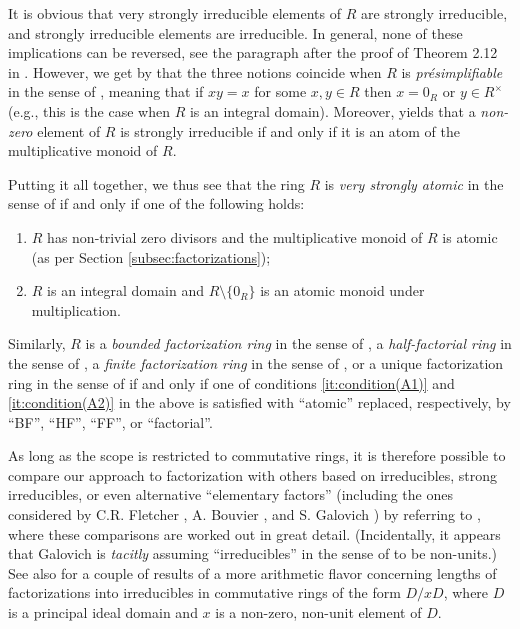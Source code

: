 It is obvious that very strongly irreducible elements of $R$ are strongly irreducible, and strongly irreducible elements are irreducible. In general, none of these implications can be reversed, see the paragraph after the proof of Theorem 2.12 in \cite{AnVL96}. However, we get by \cite[Theorem 2.2(3)]{AnVL96} that the three notions coincide when $R$ is \emph{pr\'esimplifiable} in the sense of \cite{Bou74a}, meaning that if $xy = x$ for some $x, y \in R$ then $x = 0_R$ or $y \in R^\times$ (e.g., this is the case when $R$ is an integral domain). Moreover, \cite[Theorem 2.5]{AnVL96} yields that a \emph{non-zero} element of $R$ is strongly irreducible if and only if it is an atom of the multiplicative monoid of $R$.

Putting it all together, we thus see that the ring $R$ is \emph{very strongly atomic} in the sense of \cite[Definition 3.1]{AnVL96} if and only if one of the following holds:
\begin{enumerate}[label={(\small{A}\arabic{*})}]
	\item\label{it:condition(A1)} $R$ has non-trivial zero divisors and the multiplicative monoid of $R$ is atomic (as per Section \ref{subsec:factorizations});
	\item\label{it:condition(A2)} $R$ is an integral domain and $R \setminus \{0_R\}$ is an atomic monoid under multiplication.
\end{enumerate}
Similarly, $R$ is a \emph{bounded factorization ring} in the sense of \cite[Definition 3.8]{AnVL96}, a \emph{half-factorial ring} in the sense of \cite[p. 87]{axtell-et-al03}, a \emph{finite factorization ring} in the sense of \cite[Definition 6.5]{AnVL96}, or a unique factorization ring in the sense of \cite[Definition 4.3]{AnVL96} if and only if one of conditions \ref{it:condition(A1)} and \ref{it:condition(A2)} in the above is satisfied with ``atomic'' replaced, respectively, by ``BF'', ``HF'', ``FF'', or ``factorial''.

As long as the scope is restricted to commutative rings, it is therefore possible to compare our approach to factorization with others based on irreducibles, strong irreducibles, or even alternative ``elementary factors'' (including the ones considered by C.R. Fletcher \cite{Fl69}, A. Bouvier \cite{Bou74a, Bou74b}, and S. Galovich \cite{Ga78}) by referring to \cite{AnVL96,chun-anderson-vl11}, where these comparisons are worked out in great detail. (Incidentally, it appears that Galovich is \emph{tacitly} assuming ``irreducibles'' in the sense of \cite{Ga78} to be non-units.) See also \cite[Theorem 3.4 and Corollary 3.5]{BaBuMi17} for a couple of results of a more arithmetic flavor concerning lengths of factorizations into irreducibles in commutative rings of the form $D/xD$, where $D$ is a principal ideal domain and $x$ is a non-zero, non-unit element of $D$. 
